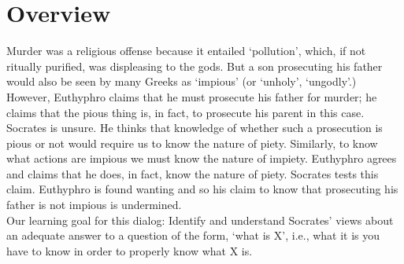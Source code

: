 \documentclass[oneside]{article}
\begin{document}
\section*{Overview}

Murder was a religious offense because it entailed `pollution', which, if not ritually purified, was displeasing to the gods. But a son prosecuting his father would also be seen by many Greeks as `impious' (or `unholy', `ungodly'.) However, Euthyphro claims that he must prosecute his father for murder; he claims that the pious thing is, in fact, to prosecute his parent in this case. Socrates is unsure. He thinks that knowledge of whether such a prosecution is pious or not would require us to know the nature of piety. Similarly, to know what actions are impious we must know the nature of impiety. Euthyphro agrees and claims that he does, in fact, know the nature of piety. Socrates tests this claim. Euthyphro  is found wanting and so his claim to know that prosecuting his father is not impious is undermined.\\ 



\noindent Our learning goal for this dialog:  Identify and understand Socrates' views about an adequate answer to a question of the form, `what is X', i.e., what it is you have to know in order to properly know what X is. 







\end{document}
